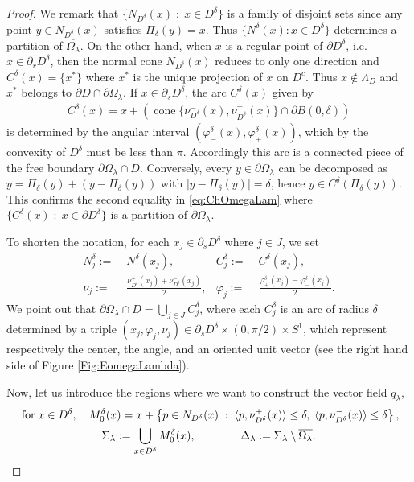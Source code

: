\documentclass[reqno,11pt]{amsart}
\theoremstyle{definition}
\numberwithin{equation}{section}
\def\ov{\overline}
\newcommand{\tinm}[1]{\text{\;#1\;}}
\newcommand{\ps}[1]{\langle #1\rangle}
\newcommand{\1}{{{\bf 1}\kern-0,28em\rm l}}
\def\sepa{\; : \;}
\def\proj{\Pi}
\newcommand{\aco}[1]{\left\{#1\right\}}
\def\O{\Omega}
\def\l{\lambda}
\begin{document}
\begin{proof}
We remark that $\{N_{D^\delta}(x) \sepa x\in D^\delta\}$ is a family of disjoint sets since  any point $y\in N_{D^\delta}(x)$ satisfies $\proj_\delta(y)=x$.
Thus $\{N^\delta(x): x\in D^\delta\}$ determines a partition of $\ov{\Omega_\lambda}$.
On the other hand, when $x$ is a regular point of $\partial D^\delta$, i.e. $x\in\partial_r D^\delta$, then the normal cone $N_{D^\delta}(x)$  reduces to only one direction and $C^\delta(x)=\{x^*\}$ where $x^*$ is the unique projection of $x$ on $D^c$. Thus $x\notin \Lambda_D$ and $x^*$ belongs to $\partial D\cap\partial\Omega_\l$. If $x\in \partial_s D^\delta$, the arc $C^\delta(x)$  given by
\begin{align*}
C^\delta(x)= x+\left(\operatorname{cone}\{ \nu_{D^\delta}^-(x), \nu_{D^\delta}^+(x)\}\cap \partial {B(0,\delta)} \right)
\end{align*}
is determined by the angular interval $(\varphi_-^\delta(x),\varphi_+^\delta(x))$, which by the convexity of $D^\delta$ must be less than $\pi$.
Accordingly this arc is a connected piece  of the free boundary $\partial \O_\l \cap D$. Conversely, every $y\in \partial\Omega_\lambda$ can be decomposed as $y = \proj_\delta (y) + (y-\proj_\delta (y))$ with $|y- \proj_\delta (y)| =\delta$, hence $y\in C^\delta(\proj_\delta (y))$. This confirms the second equality in \eqref{eq:ChOmegaLam} where  $\{C^\delta(x) \sepa x\in\partial D^\delta\}$ is a partition of $\partial\Omega_\lambda$. 

\medskip
To shorten the notation, for each $x_j\in \partial_s D^\delta$ where $j\in J$, we set 
\begin{align}
 N^\delta_j :=& \; N^\delta(x_j), & C^\delta_j :=& \; C^\delta(x_j), \label{set:Cj}\\
 \nu_j := &\; \frac{\nu_{D^\delta}^+(x_j)+ \nu_{D^\delta}^-(x_j)}{2}, & \varphi_j:=&\; \frac{\varphi_+^\delta(x_j) - \varphi_-^\delta(x_j)}{2}.\label{set:nuj}
\end{align}
We point out that $\partial\Omega_\lambda\cap D =\bigcup_{j \in J} C^\delta_j$, where each  $C^\delta_j$ is an arc of radius $\delta$ determined  by a triple 
$(x_j,\varphi_j,\nu_j)\in \partial_s D^\delta\times(0,\pi/2)\times S^1$,  which represent respectively the center, the  angle, and an oriented unit vector 
(see the right hand side of Figure \ref{Fig:EomegaLambda}).


Now, let us introduce the regions where we want to construct the vector field $q_\lambda$,
\begin{gather}
\tinm{for} x\in D^\delta,\quad M^\delta_0 (x) = x+ \aco{ p\in N_{D^\delta}(x) \sepa \ps{ p, \nu_{D^\delta}^+(x) } \le \delta,\;  \ps{ p, \nu_{D^\delta}^-(x) } \le \delta },\label{set:M}\\
\Sigma_\lambda:= \bigcup_{x\in D^\delta} M^\delta_0(x), \qquad \qquad \Delta_\lambda:= \Sigma_\lambda\setminus\ov{\Omega_\lambda}. \label{set:sigmal}
\end{gather}





\end{proof}
\end{document}
